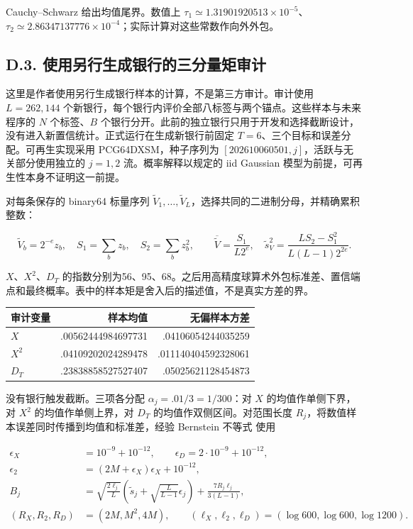 \documentclass[11pt,a4paper]{article}
\begin{document}
Cauchy--Schwarz 给出均值尾界。数值上
\(\tau_1\simeq1.31901920513\times10^{-5}\)、\(\tau_2\simeq2.86347137776\times10^{-4}\)；实际计算对这些常数作向外外包。

\subsection*{D.3.
使用另行生成银行的三分量矩审计}\label{d.3.-ux4f7fux7528ux53e6ux884cux751fux6210ux94f6ux884cux7684ux4e09ux5206ux91cfux77e9ux5ba1ux8ba1}

这里是作者使用另行生成银行样本的计算，不是第三方审计。审计使用
\(L=262,144\)
个新银行，每个银行内评价全部八标签与两个锚点。这些样本与未来程序的 \(N\)
个标签、\(B\)
个银行分开。此前的独立银行只用于开发和选择截断设计，没有进入新置信统计。正式运行在生成新银行前固定
\(T=6\)、三个目标和误差分配。可再生实现采用 PCG64DXSM，种子序列为
\([202610060501,j]\)，活跃与无关部分使用独立的 \(j=1,2\)
流。概率解释以规定的 iid Gaussian
模型为前提，可再生性本身不证明这一前提。

对每条保存的 binary64 标量序列
\(\widetilde V_1,\ldots,\widetilde V_L\)，选择共同的二进制分母，并精确累积整数：

\[
\widetilde V_b=2^{-e}z_b,\quad S_1=\sum_bz_b,\quad S_2=\sum_bz_b^2,\qquad
\overline{\widetilde V}=\frac{S_1}{L2^e},\quad
\widetilde s_V^2=\frac{LS_2-S_1^2}{L(L-1)2^{2e}}.
\tag{D.8}
\]

\(X\)、\(X^2\)、\(D_T\)
的指数分别为56、95、68。之后用高精度球算术外包标准差、置信端点和最终概率。表中的样本矩是舍入后的描述值，不是真实方差的界。

\begin{longtable}[]{@{}lrr@{}}
\toprule\noalign{}
审计变量 & 样本均值 & 无偏样本方差 \\
\midrule\noalign{}
\endhead
\bottomrule\noalign{}
\endlastfoot
\(X\) & .00562444984697731 & .04106054244035259 \\
\(X^2\) & .04109202024289478 & .011140404592328061 \\
\(D_T\) & .23838858527527407 & .05025621128454873 \\
\end{longtable}

没有银行触发截断。三项各分配 \(\alpha_j=.01/3=1/300\)：对 \(X\)
的均值作单侧下界，对 \(X^2\) 的均值作单侧上界，对 \(D_T\)
的均值作双侧区间。对范围长度
\(R_j\)，将数值样本误差同时传播到均值和标准差，经验 Bernstein 不等式
\citep[Theorem 4]{maurer2009} 使用

\[
\begin{aligned}
\epsilon_X&=10^{-9}+10^{-12},\qquad
\epsilon_D=2\cdot10^{-9}+10^{-12},\\
\epsilon_2&=(2M+\epsilon_X)\epsilon_X+10^{-12},\\
B_j&=\sqrt{\frac{2\ell_j}{L}}\!
 \left(\widetilde s_j+\sqrt{\frac{L}{L-1}}\epsilon_j\right)
 +\frac{7R_j\ell_j}{3(L-1)},\\
(R_X,R_2,R_D)&=(2M,M^2,4M),\qquad
(\ell_X,\ell_2,\ell_D)=(\log600,\log600,\log1200).
\end{aligned}
\tag{D.9}
\]
\end{document}
